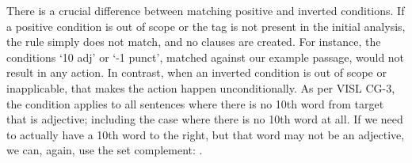 There is a crucial difference between matching positive and inverted conditions.
If a positive condition is out of scope or the tag is not present in the initial analysis, the rule simply does not match, and no clauses are created. For instance, the conditions `10 adj' or `-1 punct', matched against our example passage, would not result in any action.
In contrast, when an inverted condition is out of scope or inapplicable,
that makes the action happen unconditionally.
As per VISL CG-3, the condition  applies to all sentences where there is no 10th word from target that is adjective; including the case where there is no 10th word at all.
If we need to actually have a 10th word to the right, but that word may not be an adjective, we can, again, use the set complement: .





